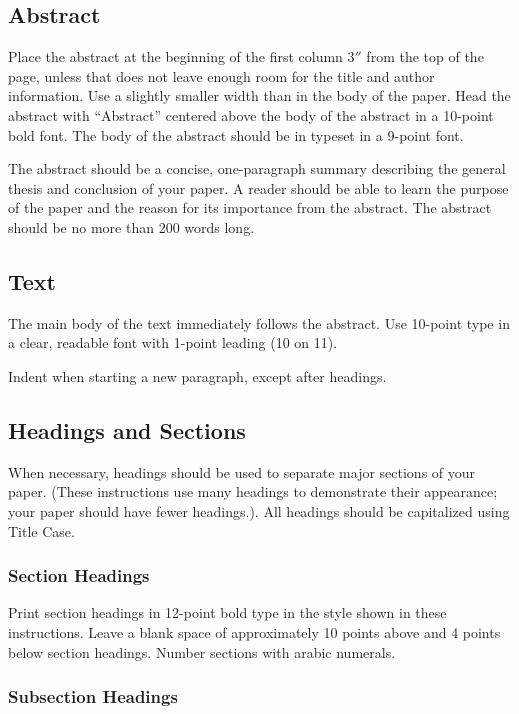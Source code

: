 \documentclass{article}
\begin{document}
\subsection{Abstract}

Place the abstract at the beginning of the first column 3$''$ from the
top of the page, unless that does not leave enough room for the title
and author information. Use a slightly smaller width than in the body
of the paper. Head the abstract with ``Abstract'' centered above the
body of the abstract in a 10-point bold font. The body of the abstract
should be in typeset in a 9-point font.

The abstract should be a concise, one-paragraph summary describing the
general thesis and conclusion of your paper. A reader should be able
to learn the purpose of the paper and the reason for its importance
from the abstract. The abstract should be no more than 200 words long.

\subsection{Text}

The main body of the text immediately follows the abstract. Use 10-point type
in a clear, readable font with 1-point leading (10 on 11).

Indent when starting a new paragraph, except after headings.

\subsection{Headings and Sections}

When necessary, headings should be used to separate major sections of your
paper. (These instructions use many headings to demonstrate their appearance;
your paper should have fewer headings.). All headings should be capitalized
using Title Case.

\subsubsection{Section Headings}

Print section headings in 12-point bold type in the style shown in these
instructions. Leave a blank space of approximately 10 points above and 4 points
below section headings. Number sections with arabic numerals.

\subsubsection{Subsection Headings}
\end{document}
